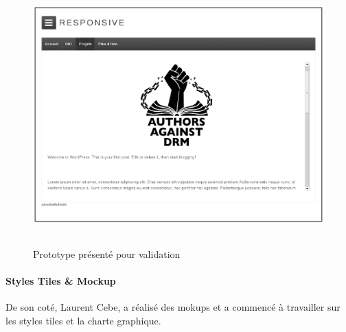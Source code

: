\documentclass[11pt,a4paper,twoside]{report}
\begin{document}
				\begin{figure}[H]
					\centering
					\includegraphics[height=10cm]{Prototype.eps}
					\caption{Prototype présenté pour validation}
					\label{fig:Prototype}
				\end{figure}

			\paragraph*{Styles Tiles \& Mockup}De son coté, Laurent Cebe, a réalisé des mokups et a commencé à travailler sur les styles tiles et la charte graphique.
\end{document}
